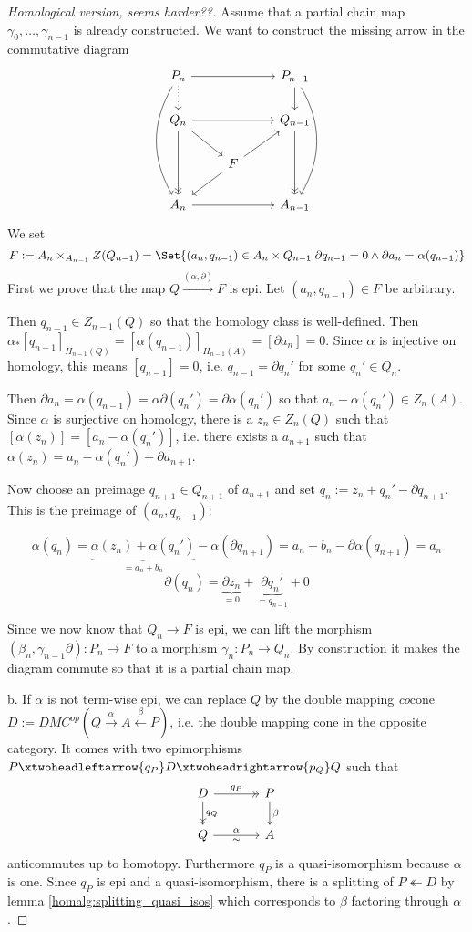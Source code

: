 \documentclass[fontsize=11pt,fleqn,a4paper]{scrartcl}
\begin{document}
\begin{proof}[Homological version, seems harder??]
Assume that a partial chain map $\gamma_0,\ldots,\gamma_{n-1}$ is already constructed. We want to construct the missing arrow in the commutative diagram
\[\begin{tikzcd}
P_n \ar[rr] \ar[d,dotted] \ar[ddd,bend right] && P_{n-1} \ar[d] \ar[ddd,bend left] \\
Q_n \ar[dd,->>] \ar[rr] \ar[rd] && Q_{n-1} \ar[dd,->>] \\
& F \ar[ru] \ar[ld] & \\
A_n \ar[rr] && A_{n-1}
\end{tikzcd}\]
We set
\[F:=A_n \times_{A_{n-1}} Z(Q_{n-1}) = \Set{(a_n,q_{n-1})\in A_n\times Q_{n-1} | \partial q_{n-1} = 0 \wedge \partial a_n = \alpha(q_{n-1})}\]
First we prove that the map $Q \xrightarrow{(\alpha,\partial)} F$ is epi. Let $(a_n,q_{n-1})\in F$ be arbitrary.

Then $q_{n-1} \in Z_{n-1}(Q)$ so that the homology class is well-defined. Then $\alpha_\ast [q_{n-1}]_{H_{n-1}(Q)} = [\alpha(q_{n-1})]_{H_{n-1}(A)} = [\partial a_n] = 0$. Since $\alpha$ is injective on homology, this means $[q_{n-1}] = 0$, i.e. $q_{n-1} = \partial q_n'$ for some $q_n'\in Q_n$.

Then $\partial a_n = \alpha(q_{n-1}) = \alpha\partial(q_n') = \partial \alpha(q_n')$ so that $a_n-\alpha(q_n')\in Z_n(A)$. Since $\alpha$ is surjective on homology, there is a $z_n\in Z_n(Q)$ such that $[\alpha(z_n)] = [a_n-\alpha(q_n')]$, i.e. there exists a $a_{n+1}$ such that $\alpha(z_n) = a_n - \alpha(q_n') + \partial a_{n+1}$.

Now choose an preimage $q_{n+1}\in Q_{n+1}$ of $a_{n+1}$ and set $q_n := z_n+q_n' - \partial q_{n+1}$. This is the preimage of $(a_n,q_{n-1})$:

\[\alpha(q_n) = \underbrace{\alpha(z_n)+\alpha(q_n')}_{=a_n+b_n} - \alpha(\partial q_{n+1}) = a_n + b_n - \partial\alpha(q_{n+1}) = a_n\]
\[\partial(q_n) = \underbrace{\partial z_n}_{=0} + \underbrace{\partial q_n'}_{=q_{n-1}} + 0\]

\medbreak
Since we now know that $Q_n \to F$ is epi, we can lift the morphism $(\beta_n,\gamma_{n-1}\partial): P_n \to F$ to a morphism $\gamma_n: P_n\to Q_n$. By construction it makes the diagram commute so that it is a partial chain map.

\medbreak
b. If $\alpha$ is not term-wise epi, we can replace $Q$ by the double mapping \emph{co}cone $D:=DMC^{op}(Q\xrightarrow{\alpha}A\xleftarrow{\beta}P)$, i.e. the double mapping cone in the opposite category. It comes with two epimorphisms $P \xtwoheadleftarrow{q_P} D \xtwoheadrightarrow{p_Q} Q$ such that
\[\begin{tikzcd}[column sep=large]
D \ar[d,->>,"q_Q"] \ar[r,->>,"q_P"] & P \ar[d,"\beta"] \\
Q \ar[r,"\alpha","\sim"'] & A
\end{tikzcd}\]
anticommutes up to homotopy. Furthermore $q_P$ is a quasi-isomorphism because $\alpha$ is one. Since $q_P$ is epi and a quasi-isomorphism, there is a splitting of $P \twoheadleftarrow D$ by lemma \ref{homalg:splitting_quasi_isos} which corresponds to $\beta$ factoring through $\alpha$.


\end{proof}
\end{document}
